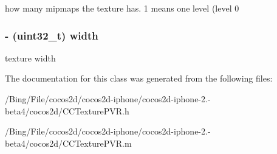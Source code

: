 how many mipmaps the texture has. 1 means one level (level 0 \hypertarget{interface_c_c_texture_p_v_r_a6888f6b09a2bfdc4b2017fa440e6efe2}{
\subsubsection[{width}]{\setlength{\rightskip}{0pt plus 5cm}-\/ (uint32\-\_\-t) {\bf width}}}\label{interface_c_c_texture_p_v_r_a6888f6b09a2bfdc4b2017fa440e6efe2}
texture width 

The documentation for this class was generated from the following files\-:\begin{DoxyCompactItemize}
\item 
/\-Bing/\-File/cocos2d/cocos2d-\/iphone/cocos2d-\/iphone-\/2.-\/beta4/cocos2d/C\-C\-Texture\-P\-V\-R.\-h\item 
/\-Bing/\-File/cocos2d/cocos2d-\/iphone/cocos2d-\/iphone-\/2.-\/beta4/cocos2d/C\-C\-Texture\-P\-V\-R.\-m\end{DoxyCompactItemize}
